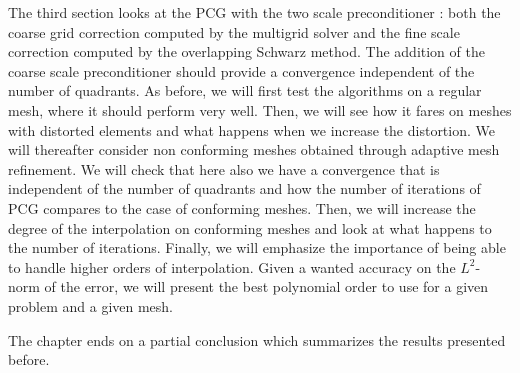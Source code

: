 The third section looks at the PCG with the two scale preconditioner : both the coarse grid correction computed by the multigrid solver and the fine scale correction computed by the overlapping Schwarz method. The addition of the coarse scale preconditioner should provide a convergence independent of the number of quadrants. As before, we will first test the algorithms on a regular mesh, where it should perform very well. Then, we will see how it fares on meshes with distorted elements and what happens when we increase the distortion. We will thereafter consider non conforming meshes obtained through adaptive mesh refinement. We will check that here also we have a convergence that is independent of the number of quadrants and how the number of iterations of PCG compares to the case of conforming meshes. Then, we will increase the degree of the interpolation on conforming meshes and look at what happens to the number of iterations. Finally, we will emphasize the importance of being able to handle higher orders of interpolation. Given a wanted accuracy on the $L^2$-norm of the error, we will present the best polynomial order to use for a given problem and a given mesh. 

The chapter ends on a partial conclusion which summarizes the results presented before.

  
